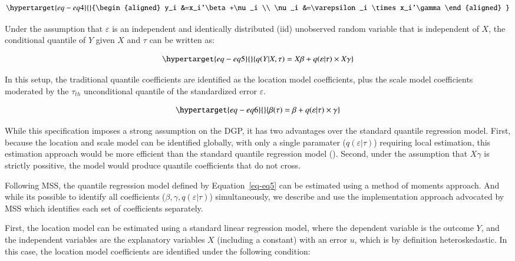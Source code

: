 \documentclass[
  authoryear,
  review,
  1p]{elsarticle}
\begin{document}
\begin{equation}\protect\hypertarget{eq-eq4}{}{\begin{aligned}
y_i &=x_i'\beta+\nu_i \\
\nu_i &=\varepsilon_i \times x_i'\gamma 
\end{aligned}
}\label{eq-eq4}\end{equation}

Under the assumption that \(\varepsilon\) is an independent and
identically distributed (iid) unobserved random variable that is
independent of \(X\), the conditional quantile of \(Y\) given \(X\) and
\(\tau\) can be written as:

\begin{equation}\protect\hypertarget{eq-eq5}{}{q(Y|X,\tau) =X\beta+q(\varepsilon|\tau) \times X\gamma 
}\label{eq-eq5}\end{equation}

In this setup, the traditional quantile coefficients are identified as
the location model coefficients, plus the scale model coefficients
moderated by the \(\tau_{th}\) unconditional quantile of the
standardized error \(\varepsilon\).

\begin{equation}\protect\hypertarget{eq-eq6}{}{\beta(\tau) = \beta + q(\varepsilon|\tau) \times \gamma 
}\label{eq-eq6}\end{equation}

While this specification imposes a strong assumption on the DGP, it has
two advantages over the standard quantile regression model. First,
because the location and scale model can be identified globally, with
only a single paramater (\(q(\varepsilon|\tau)\)) requiring local
estimation, this estimation approach would be more efficient than the
standard quantile regression model (\citet{zhao2000}). Second, under the
assumption that \(X\gamma\) is strictly possitive, the model would
produce quantile coefficients that do not cross.

Following MSS, the quantile regression model defined by
Equation~\ref{eq-eq5} can be estimated using a method of moments
approach. And while its possible to identify all coefficients
(\(\beta,\gamma, q(\varepsilon|\tau)\)) simultaneously, we describe and
use the implementation approach advocated by MSS which identifies each
set of coefficients separately.

First, the location model can be estimated using a standard linear
regression model, where the dependent variable is the outcome \(Y\), and
the independent variables are the explanatory variables \(X\) (including
a constant) with an error \(u\), which is by definition heteroskedastic.
In this case, the location model coefficients are identified under the
following condition:
\end{document}
